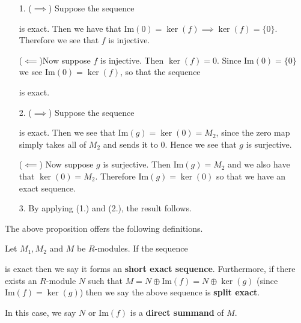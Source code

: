 \documentclass[12pt,letterpaper]{algebra_book}
\newcommand{\smallish}{1.45em} %
\newcommand{\im}{\mbox{Im}}
\theoremstyle{definition}
\begin{document}
\begin{prf}
    \begin{itemize}
        \item[1.]  
        ($\implies$) Suppose the sequence 
        is exact. Then we have that $\im(0) = \ker(f) \implies
        \ker(f) = \{0\}$. Therefore we see that $f$ is injective. 

        ($\impliedby$)Now suppose $f$ is injective. Then $\ker(f) = 0$. Since
        $\im(0) = \{0\}$ we see $\im(0) = \ker(f)$, so that the
        sequence             
        is exact.

        \item[2.] ($\implies$) Suppose the sequence 
        is exact. Then we see that $\im(g) = \ker(0) = M_2$, since
        the zero map simply takes all of $M_2$ and sends it to $0$.
        Hence we see that $g$ is surjective. 

        ($\impliedby$) Now suppose $g$ is surjective. Then $\im(g)
        = M_2$ and we also have that $\ker(0) = M_2$. Therefore
        $\im(g) = \ker(0)$ so that we have an exact sequence. 

        \item[3.] By applying (1.) and (2.), the result follows.
    \end{itemize}
\end{prf}

The above proposition offers the following definitions. 

\begin{definition}
    Let $M_1, M_2$ and $M$ be $R$-modules. If the sequence
    \begin{center}
    \end{center}
    is exact then we say it forms an \textbf{short exact
    sequence}. Furthermore, if there exists an $R$-module $N$ such
    that $M = N \oplus \im(f) = N \oplus \ker(g)$ (since $\im(f) =
    \ker(g)$) then we say the above sequence is \textbf{split
    exact}.

    In this case, we say $N$ or $\im(f)$ is a \textbf{direct   
    summand} of $M$.
\end{definition}
\end{document}
